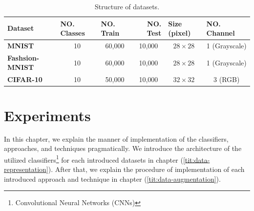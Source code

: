 \begin{table}[]
  \label{dataset_table}
  \begin{tabular}{
      l |
      c
      c
      c
      c
      c}
    \hline
    {\textbf{Dataset}}        & \multicolumn{1}{l}{{\textbf{NO. Classes}}} & \multicolumn{1}{l}{{\textbf{NO. Train}}} & \multicolumn{1}{r}{{\textbf{NO. Test}}} & \multicolumn{1}{l}{{\textbf{Size (pixel)}}} & \multicolumn{1}{l}{{\textbf{NO. Channel}}} \\ \hline
    {\textbf{MNIST}}          & 10                                         & 60,000
                              & 10,000                                     & $28\times28$                             & 1
    (Grayscale)                                                                                                                                                                                                                                            \\
    {\textbf{Fashsion-MNIST}} & 10                                         & 60,000
                              & 10,000                                     & $28\times28$
                              & 1 (Grayscale)                                                                                                                                                                                                              \\
    {\textbf{CIFAR-10}}       & 10                                         & 50,000
                              & 10,000                                     & $32\times32$                             & 3
    (RGB)                                                                                                                                                                                                                                                  \\ \hline
  \end{tabular}
  \caption{Structure of datasets.}
\end{table}


\chapter{Experiments}
In this chapter, we explain the manner of implementation of the classifiers, approaches, and
techniques pragmatically. We introduce the architecture of the utilized
classifiers\footnote{Convolutional Neural Networks (CNNs)} for each introduced datasets in chapter
(\ref{tit:data-representation}). After that, we explain the procedure of implementation of each
introduced approach and technique in chapter (\ref{tit:data-augmentation}).

